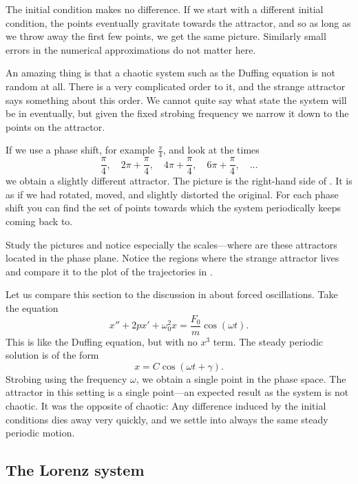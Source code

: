 \documentclass{ximera}
\begin{document}
The initial condition makes no difference. If we start with a different initial condition, the points eventually gravitate towards the attractor, and so as long as we throw away the first few points, we get the same picture. Similarly small errors in the numerical approximations do not matter here.
 
An amazing thing is that a chaotic system such as the Duffing equation is not random at all.  There is a very complicated order to it, and the strange attractor says something about this order.  We cannot quite say what state the system will be in eventually, but given the fixed strobing frequency we narrow it down to the points on the attractor.

If we use a phase shift, for example $\frac{\pi}{4}$, and look at the times
\begin{equation*}
    \frac{\pi}{4}, \quad 2\pi+\frac{\pi}{4}, \quad 4\pi+\frac{\pi}{4}, \quad 6\pi+\frac{\pi}{4}, \quad \ldots
\end{equation*}
we obtain a slightly different attractor. The picture is the right-hand side of  . It is as if we had rotated, moved, and slightly distorted the original. For each phase shift you can find the set of points towards which the system periodically keeps coming back to.

Study the pictures and notice especially the scales---where are these attractors located in the phase plane.  Notice the regions where the strange attractor lives and compare it to the plot of the trajectories in .

Let us compare this section to the discussion in  about forced oscillations.  Take the equation
\begin{equation*}
    x''+2p x' + \omega_0^2 x = \frac{F_0}{m} \cos (\omega t) .
\end{equation*}
This is like the Duffing equation, but with no $x^3$ term. The steady periodic solution is of the form
\begin{equation*}
    x = C \cos (\omega t + \gamma) .
\end{equation*}
Strobing using the frequency $\omega$, we obtain a single point in the phase space.  The attractor in this setting is a single point---an expected result as the system is not chaotic.  It was the opposite of chaotic:  Any difference induced by the initial conditions dies away very quickly, and we settle into always the same steady periodic motion.

\subsection{The Lorenz system}
\end{document}
